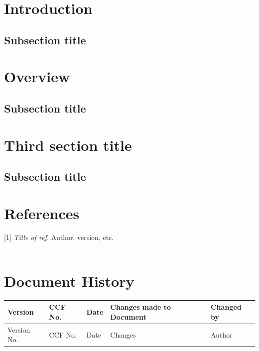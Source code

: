 \documentclass[a4paper]{article}
\begin{document}
\clearpage
\setlength\parindent{0pt}


\tableofcontents
\clearpage


\section{Introduction}

\subsection{Subsection title}

\clearpage


\section{Overview}

\subsection{Subsection title}

\clearpage


\section{Third section title}
\subsection{Subsection title}

\clearpage

\section{References}
[1] \textit{Title of ref.} Author, version, etc.
\\ \relax \\ \relax

\clearpage

\section{Document History}
\begin{tabular}{|l | l | l | l | l |}
\hline
Version & CCF No. & Date & Changes made to Document & Changed by \\
\hline
Version No. & CCF No. & Date & Changes & Author\\
\hline
\end{tabular}
\end{document}
